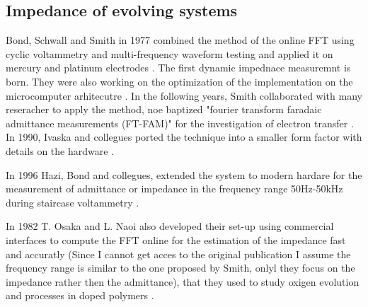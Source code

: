 \subsection{Impedance of evolving systems}
Bond, Schwall and Smith in 1977 \cite{schwallOnlineFastFourier1977} combined the method of the online FFT using cyclic voltammetry and multi-frequency waveform testing and applied it on mercury and platinum electrodes \cite{bondOnlineFFTFaradaic1977} \cite{schwallOnlineFastFourier1977}. The first dynamic impednace measuremnt is born. They were also working on the optimization of the implementation on the microcomputer arhitecutre \cite{schwallHighSpeedSynchronous1977}. 
In the following years, Smith collaborated with many reseracher to apply the method, noe baptized "fourier transform faradaic admittance measurements (FT-FAM)" for the investigation of electron transfer \cite{hayesACPolarographyUsing1980} \cite{grzeszczukMeasurementsMarcusTheory1983} \cite{grzeszczukStructuralConsequencesElectron1983} \cite{grzeszczukElectrochemicalInvestigationsTetraphenylethylene1984} \cite{ivaskaApplicationOnlineFast1985} \cite{grzeszczukElectronHydrogenAtom1986}. In 1990, Ivaska and collegues ported the technique into a smaller form factor with details on the hardware \cite{engblomExperiencesOnLineFourier1990}.

In 1996 Hazi, Bond and collegues, extended the system to modern hardare for the measurement of admittance or impedance in the frequency range 50Hz-50kHz during staircase voltammetry \cite{haziMicrocomputerbasedInstrumentationMultifrequency1997} \cite{schieweUnifiedApproachTrace1998}.

In 1982 T. Osaka and L. Naoi \cite{osakaApplicationOnlineImpedance1982} also developed their set-up using commercial interfaces to compute the FFT online for the estimation of the impedance fast and accuratly (Since I cannot get acces to the original publication I assume the frequency range is similar to the one proposed by Smith, onlyl they focus on the impedance rather then the admittance), that they used to study oxigen evolution \cite{osakaStudyTimedependenceOxygen1984} and processes in doped polymers \cite{osakaElectrochemicalStudyAnion1984} \cite{osakaStudyChargeDischargeCharacteristics1984}\cite{osakaApplicationConductive985}.

